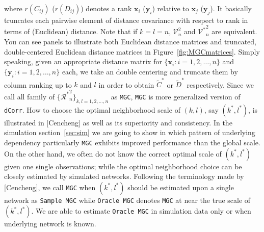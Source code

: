 \documentclass[12pt]{article}
\theoremstyle{definition}
\begin{document}
where $r(C_{ij})$ ($r(D_{ij})$) denotes a rank $\mathbf{x}_{i}$ ($\mathbf{y}_{i}$) relative to $\mathbf{x}_{j}$ ($\mathbf{y}_{j}$). It basically truncates each pairwise element of distance covariance with respect to rank in terms of (Euclidean) distance. Note that if $k=l=n$, $\mathcal{V}^2_{n}$ and ${\mathcal{V}^{*}}^2_{n}$ are equivalent. You can see panels to illustrate both Euclidean distance matrices and truncated, double-centered Euclidean distance matrices in Figure~\ref{fig:MGCmatrices}. Simply speaking, given an appropriate distance matrix for $\{  \mathbf{x}_{i}  : i = 1,2, \ldots, n \}$ and $\{ \mathbf{y}_{i} : i=1,2,\ldots, n \}$ each, we take an double centering and truncate them by column ranking up to $k$ and $l$ in order to obtain $\tilde{C}^{*}$ or $\tilde{D}^{*}$ respectively. Since we call all family of $\{  {\mathcal{R}^{*}}^2_{n} \}_{k,l = 1,2,...,n}$ as \texttt{MGC}, \texttt{MGC} is more generalized version of \texttt{dCorr}. How to choose the optimal neighborhood scale of $(k,l)$, say $(k^{*}, l^{*})$, is illustrated in [Cencheng] as well as its superiority and consistency. In the simulation section~\ref{sec:sim} we are going to show in which pattern of underlying dependency particularly \texttt{MGC} exhibits improved performance than the global scale. On the other hand, we often do not know the correct optimal scale of $(k^{*}, l^{*})$ given one single observations; while the optimal neighborhood choice can be closely estimated by simulated networks. Following the terminology made by [Cencheng], we call \texttt{MGC} when $(k^{*}, l^{*})$ should be estimated upon a single network as \texttt{Sample MGC} while \texttt{Oracle MGC} denotes \texttt{MGC} at near the true scale of $(k^{*}, l^{*})$. We are able to estimate \texttt{Oracle MGC} in simulation data only or when underlying network is known.  
\end{document}
